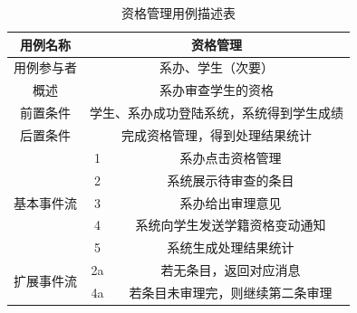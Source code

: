 \documentclass[12pt, a4paper, oneside]{ctexart}
\begin{document}
\begin{table}[H]
    \centering
    \begin{tabular}{|c|cc|}
    \hline
    用例名称                   & \multicolumn{2}{c|}{资格管理}                  \\ \hline
    用例参与者                  & \multicolumn{2}{c|}{系办、学生（次要）}             \\ \hline
    概述                     & \multicolumn{2}{c|}{系办审查学生的资格}             \\ \hline
    前置条件                   & \multicolumn{2}{c|}{学生、系办成功登陆系统，系统得到学生成绩}  \\ \hline
    后置条件                   & \multicolumn{2}{c|}{完成资格管理，得到处理结果统计}       \\ \hline
    \multirow{5}{*}{基本事件流} & \multicolumn{1}{c|}{1}  & 系办点击资格管理         \\ \cline{2-3} 
                           & \multicolumn{1}{c|}{2}  & 系统展示待审查的条目       \\ \cline{2-3} 
                           & \multicolumn{1}{c|}{3}  & 系办给出审理意见         \\ \cline{2-3} 
                           & \multicolumn{1}{c|}{4}  &  系统向学生发送学籍资格变动通知       \\ \cline{2-3} 
                           & \multicolumn{1}{c|}{5}  &  系统生成处理结果统计 \\ \hline
    \multirow{2}{*}{扩展事件流} & \multicolumn{1}{c|}{2a} & 若无条目，返回对应消息      \\ \cline{2-3} 
                           & \multicolumn{1}{c|}{4a} & 若条目未审理完，则继续第二条审理 \\ \hline
    \end{tabular}
    \caption{资格管理用例描述表}
\end{table}
\end{document}
